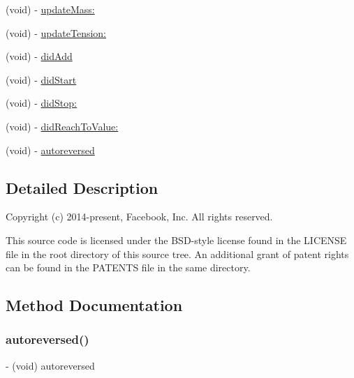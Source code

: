 \begin{DoxyCompactItemize}
\item 
(void) -\/ \mbox{\hyperlink{category_p_o_p_animation_tracer_07_internal_08_a1e41c2f1b7c5332730d2c834e0420367}{update\+Mass\+:}}
\item 
(void) -\/ \mbox{\hyperlink{category_p_o_p_animation_tracer_07_internal_08_a5010bbc6fa2ec5426d33706651e584de}{update\+Tension\+:}}
\item 
(void) -\/ \mbox{\hyperlink{category_p_o_p_animation_tracer_07_internal_08_ad853415c050d51eea5ca62c154e9e94a}{did\+Add}}
\item 
(void) -\/ \mbox{\hyperlink{category_p_o_p_animation_tracer_07_internal_08_a91b472c0e05c912fe9d05e2e9de17f9f}{did\+Start}}
\item 
(void) -\/ \mbox{\hyperlink{category_p_o_p_animation_tracer_07_internal_08_aa97d51350238303c671157f782583a9b}{did\+Stop\+:}}
\item 
(void) -\/ \mbox{\hyperlink{category_p_o_p_animation_tracer_07_internal_08_a03287c5af7d17de6143c7dcc0ac56251}{did\+Reach\+To\+Value\+:}}
\item 
(void) -\/ \mbox{\hyperlink{category_p_o_p_animation_tracer_07_internal_08_a641c94b868612f3d5b92b24cc4098517}{autoreversed}}
\end{DoxyCompactItemize}


\subsection{Detailed Description}
Copyright (c) 2014-\/present, Facebook, Inc. All rights reserved.

This source code is licensed under the B\+S\+D-\/style license found in the L\+I\+C\+E\+N\+SE file in the root directory of this source tree. An additional grant of patent rights can be found in the P\+A\+T\+E\+N\+TS file in the same directory. 

\subsection{Method Documentation}
\mbox{\label{category_p_o_p_animation_tracer_07_internal_08_a641c94b868612f3d5b92b24cc4098517}} 
\subsubsection{\texorpdfstring{autoreversed()}{autoreversed()}\hspace{0.1cm}{\footnotesize\ttfamily [1/2]}}
{\footnotesize\ttfamily -\/ (void) autoreversed \begin{DoxyParamCaption}{ }\end{DoxyParamCaption}}

